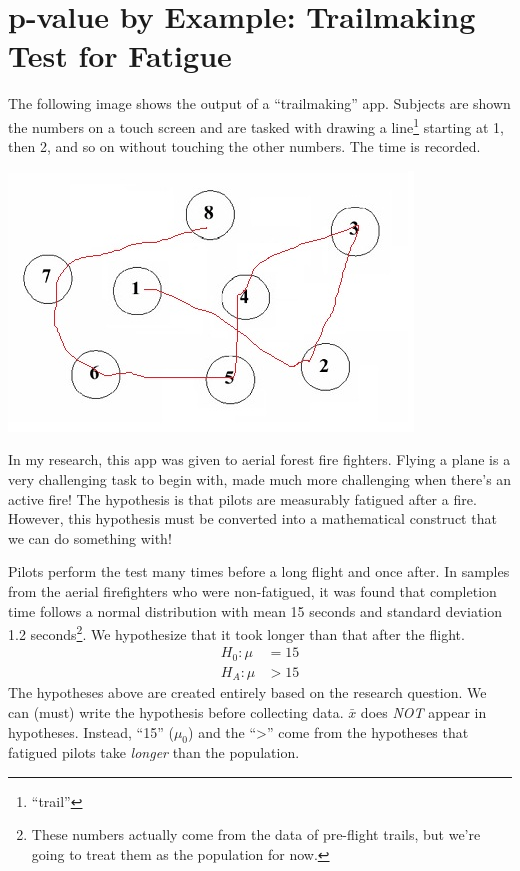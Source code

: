 \documentclass[
  letterpaper,
  DIV=11,
  numbers=noendperiod,
  oneside]{scrreprt}
\begin{document}
\hypertarget{p-value-by-example-trailmaking-test-for-fatigue}{%
\section{p-value by Example: Trailmaking Test for
Fatigue}\label{p-value-by-example-trailmaking-test-for-fatigue}}

The following image shows the output of a ``trailmaking'' app. Subjects
are shown the numbers on a touch screen and are tasked with drawing a
line\footnote{``trail''} starting at 1, then 2, and so on without
touching the other numbers. The time is recorded.

\includegraphics{figs/Trails.jpg}

In my research, this app was given to aerial forest fire fighters.
Flying a plane is a very challenging task to begin with, made much more
challenging when there's an active fire! The hypothesis is that pilots
are measurably fatigued after a fire. However, this hypothesis must be
converted into a mathematical construct that we can do something with!

Pilots perform the test many times before a long flight and once after.
In samples from the aerial firefighters who were non-fatigued, it was
found that completion time follows a normal distribution with mean 15
seconds and standard deviation 1.2 seconds\footnote{These numbers
  actually come from the data of pre-flight trails, but we're going to
  treat them as the population for now.}. We hypothesize that it took
longer than that after the flight. \begin{align*}
H_0: \mu &= 15\\
H_A: \mu &> 15
\end{align*} The hypotheses above are created entirely based on the
research question. We can (must) write the hypothesis before collecting
data. \(\bar x\) does \emph{NOT} appear in hypotheses. Instead, ``15''
(\(\mu_0\)) and the ``\textgreater{}'' come from the hypotheses that
fatigued pilots take \emph{longer} than the population.
\end{document}
